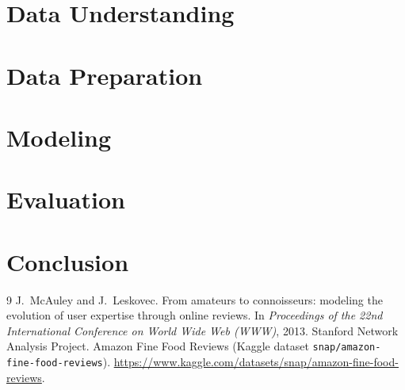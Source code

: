 \documentclass[a4paper,11pt]{report}
\begin{document}
\chapter{Data Understanding}
\label{ch:data-understanding}


\chapter{Data Preparation}
\label{ch:data-preparation}


\chapter{Modeling}
\label{ch:modeling}


\chapter{Evaluation}
\label{ch:evaluation}


\chapter{Conclusion}
\label{ch:conclusion}


\begin{thebibliography}{9}
 J.~McAuley and J.~Leskovec. From amateurs to connoisseurs: modeling the evolution of user expertise through online reviews. In \emph{Proceedings of the 22nd International Conference on World Wide Web (WWW)}, 2013.
 Stanford Network Analysis Project. Amazon Fine Food Reviews (Kaggle dataset \texttt{snap/amazon-fine-food-reviews}). \url{https://www.kaggle.com/datasets/snap/amazon-fine-food-reviews}.
\end{thebibliography}
\end{document}
